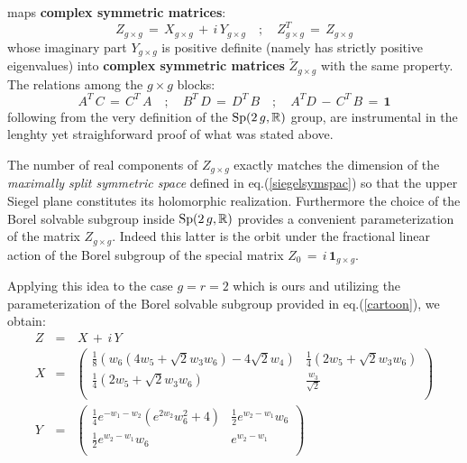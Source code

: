 \documentclass[10pt,a4paper]{article}
\newcommand{\Sp}{\mathop{\rm {}Sp}}
\def\tilde{\widetilde}
\begin{document}
maps \textbf{complex symmetric matrices}:
\begin{equation}\label{Zetone}
  Z_{g\times g} \, = \,  X_{g\times g} \, + \, \mathit{i} \, Y_{g\times g} \quad ; \quad  Z_{g\times g}^T \, = \,  Z_{g\times g}
\end{equation}
whose imaginary part $Y_{g\times g}$ is positive definite (namely has strictly positive eigenvalues) into \textbf{complex symmetric matrices}
$\tilde{Z}_{g\times g}$ with the same property. The relations among the $g \times g$ blocks:
\begin{equation}\label{blocrela}
  A^T \, C \, = \, C^T \, A \quad ; \quad B^T \, D \, = \, D^T \, B \quad ; \quad A^T D\, - \, C^T \, B \, = \, \mathbf{1 }
\end{equation}
following from the very definition of the $\Sp(2\,g,\mathbb{R})$ group, are instrumental in the lenghty yet straighforward proof of what was
stated above.
\par
The number of real components of $Z_{g\times g}$ exactly matches the dimension of the \textit{maximally split symmetric space} defined in
eq.(\ref{siegelsymspac}) so that the upper Siegel plane constitutes its holomorphic realization. Furthermore the choice of the Borel solvable
subgroup inside $\Sp(2\,g,\mathbb{R})$ provides a convenient parameterization of the matrix $Z_{g\times g}$. Indeed this latter is the orbit under
the fractional linear action of the Borel subgroup of the special matrix $Z_0 \, = \,\mathit{i} \, \mathbf{1}_{g\times g}$.
\par
Applying this idea to the case $g=r=2$ which is ours and utilizing the parameterization of the Borel solvable subgroup provided in
eq.(\ref{cartoon}), we obtain:
\begin{eqnarray}\label{muradilegno}
  Z & = & \, X \, + \, \mathit{i} \, Y \nonumber\\
  X & = & \left(
\begin{array}{cc}
 \frac{1}{8} \left(w_6 \left(4 w_5+\sqrt{2} w_3 w_6\right)-4 \sqrt{2} w_4\right)
   & \frac{1}{4} \left(2 w_5+\sqrt{2} w_3 w_6\right) \\
 \frac{1}{4} \left(2 w_5+\sqrt{2} w_3 w_6\right) & \frac{w_3}{\sqrt{2}} \\
\end{array}
\right) \nonumber\\
  Y & = & \left(
\begin{array}{cc}
 \frac{1}{4} e^{-w_1-w_2} \left(e^{2 w_2} w_6^2+4\right) & \frac{1}{2}
   e^{w_2-w_1} w_6 \\
 \frac{1}{2} e^{w_2-w_1} w_6 & e^{w_2-w_1} \\
\end{array}
\right)
\end{eqnarray}
\end{document}
